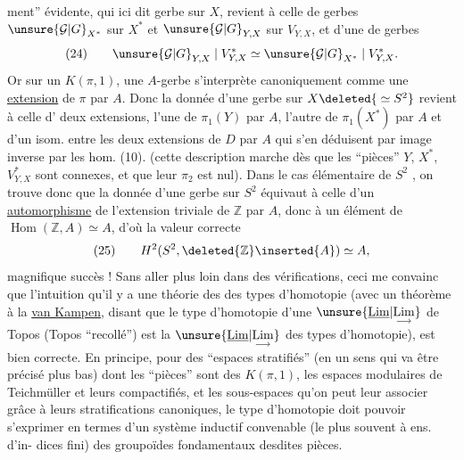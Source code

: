ment'' évidente, qui ici dit 
 gerbe 
sur $X$, revient à celle de gerbes $\unsure{\mathcal G|G}_{X^*}$ sur
$X^*$ et $\unsure{\mathcal G|G}_{Y,X}$ sur $V_{Y,X}$, et d'une
 de  gerbes
\[
(24)\qquad \unsure{\mathcal G|G}_{Y,X}\mid V^*_{Y,X}\simeq
\unsure{\mathcal G|G}_{X^*}\mid V^*_{Y,X}.
\]
Or sur un $K(\pi,1)$, une $A$-gerbe
s'interprète canoniquement comme une
\uline{extension} de $\pi$ par $A$. Donc la donnée
d'une gerbe sur $X\deleted{{}\simeq S^2}$ revient à celle
d' deux extensions, l'une de
$\pi_1(Y)$ par $A$, l'autre de $\pi_1(X^*)$ par $A$
et d'un isom. entre les deux extensions
de $D$ par $A$ qui s'en déduisent
par image inverse par les hom. (10).
(cette description marche dès que les
``pièces'' $Y$, $X^*$, $V^*_{Y,X}$ sont connexes, et
que leur $\pi_2$ est nul). Dans le cas
élémentaire de $S^2$ , on trouve donc
que la donnée d'une gerbe sur $S^2$ équivaut
à celle d'un \uline{automorphisme} de
l'extension triviale  de $\mathbb Z$ par $A$,
donc à un élément de $\operatorname{Hom}(\mathbb Z,A)\simeq A$,
d'où la valeur correcte
\[
(25)\qquad H^2(S^2,\deleted{\mathbb Z}\inserted{A})\simeq A,
\]
magnifique succès ! Sans aller plus
loin dans des vérifications, ceci me
convainc que l'intuition qu'il y
a une théorie des 
des types d'homotopie (avec un
théorème à la \uline{van Kampen}, disant
que le type d'homotopie d'une
$\unsure{\underline{\mathrm{Lim}}|\underset{\longrightarrow}{\mathrm{Lim}}}$ de Topos (Topos ``recollé'') est
la $\unsure{\underline{\mathrm{Lim}}|\underset{\longrightarrow}{\mathrm{Lim}}}$ des types d'homotopie),
est bien correcte. En principe, pour
des ``espaces stratifiés'' (en un sens qui
va être précisé plus bas) dont les
``pièces'' sont des $K(\pi,1)$, 
les espaces modulaires de Teichmüller
et leurs compactifiés, et les sous-espaces
qu'on peut leur associer grâce à leurs
stratifications canoniques, le type
d'homotopie doit pouvoir s'exprimer
en termes d'un système inductif
convenable (le plus souvent à ens. d'in-
dices fini) des groupoïdes fondamentaux
desdites pièces.

